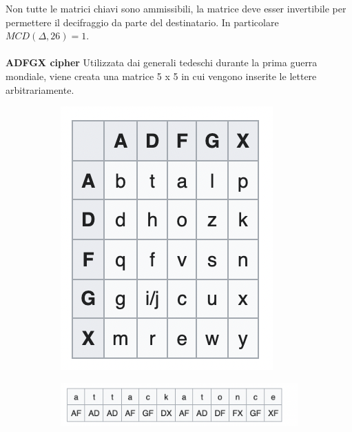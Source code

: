 \documentclass[11pt, oneside]{article}   	%
\begin{document}
Non tutte le matrici chiavi sono ammissibili, la matrice deve esser invertibile per permettere il decifraggio da parte del destinatario. In particolare \(MCD(\Delta, 26) = 1\).\\\\
\textbf{ADFGX cipher}
Utilizzata dai generali tedeschi durante la prima guerra mondiale, viene creata una matrice 5 x 5 in cui vengono inserite le lettere arbitrariamente.
\begin{figure}[H]
\begin{subfigure}[h]{0.4\linewidth}
\includegraphics[width=\linewidth]{adfgx}
\end{subfigure}
\hfill
\begin{subfigure}[h]{0.6\linewidth}
\includegraphics[width=\linewidth]{word}
\end{subfigure}%
\end{figure}
\end{document}
